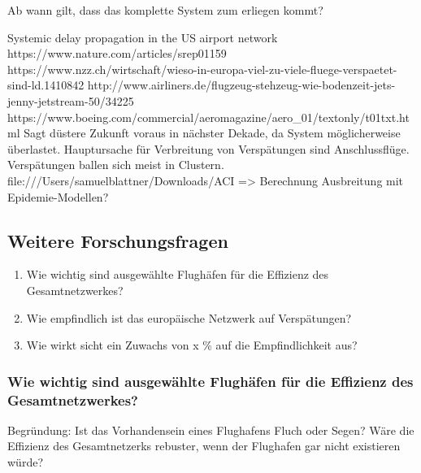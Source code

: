 Ab wann gilt, dass das komplette System zum erliegen kommt?



\guillemotleft Systemic delay propagation in the US airport network \guillemotright
https://www.nature.com/articles/srep01159
https://www.nzz.ch/wirtschaft/wieso-in-europa-viel-zu-viele-fluege-verspaetet-sind-ld.1410842
http://www.airliners.de/flugzeug-stehzeug-wie-bodenzeit-jets-jenny-jetstream-50/34225
https://www.boeing.com/commercial/aeromagazine/aero_01/textonly/t01txt.html
Sagt düstere Zukunft voraus in nächster Dekade, da System möglicherweise überlastet.
Hauptursache für Verbreitung von Verspätungen sind Anschlussflüge.
Verspätungen ballen sich meist in Clustern.
file:///Users/samuelblattner/Downloads/ACI%
=> Berechnung Ausbreitung mit Epidemie-Modellen?


\subsection{Weitere Forschungsfragen}
\begin{enumerate}
    \item Wie wichtig sind ausgewählte Flughäfen für die Effizienz des Gesamtnetzwerkes?
    \item Wie empfindlich ist das europäische Netzwerk auf Verspätungen?
    \item Wie wirkt sicht ein Zuwachs von x \% auf die Empfindlichkeit aus?
\end{enumerate}

\subsubsection{Wie wichtig sind ausgewählte Flughäfen für die Effizienz des Gesamtnetzwerkes?}
Begründung: Ist das Vorhandensein eines Flughafens Fluch oder Segen? Wäre die Effizienz des Gesamtnetzerks rebuster, wenn der Flughafen gar nicht existieren würde?

\subsubsection{}

